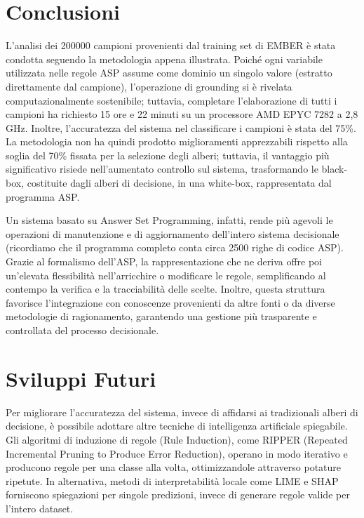 \section{Conclusioni}
L’analisi dei 200000 campioni provenienti dal training set di EMBER è stata condotta seguendo la metodologia appena illustrata. Poiché ogni variabile utilizzata nelle regole ASP assume come dominio un singolo valore (estratto direttamente dal campione), l’operazione di grounding si è rivelata computazionalmente sostenibile; tuttavia, completare l’elaborazione di tutti i campioni ha richiesto 15 ore e 22 minuti su un processore AMD EPYC 7282 a 2,8 GHz. Inoltre, l'accuratezza del sistema nel classificare i campioni è stata del 75\%. La metodologia non ha quindi prodotto miglioramenti apprezzabili rispetto alla soglia del 70\% fissata per la selezione degli alberi; tuttavia, il vantaggio più significativo risiede nell’aumentato controllo sul sistema, trasformando le black-box, costituite dagli alberi di decisione, in una white-box, rappresentata dal programma ASP.

Un sistema basato su Answer Set Programming, infatti, rende più agevoli le operazioni di manutenzione e di aggiornamento dell’intero sistema decisionale (ricordiamo che il programma completo conta circa 2500 righe di codice ASP). Grazie al formalismo dell’ASP, la rappresentazione che ne deriva offre poi un’elevata flessibilità nell’arricchire o modificare le regole, semplificando al contempo la verifica e la tracciabilità delle scelte. Inoltre, questa struttura favorisce l’integrazione con conoscenze provenienti da altre fonti o da diverse metodologie di ragionamento, garantendo una gestione più trasparente e controllata del processo decisionale.

\section{Sviluppi Futuri}
Per migliorare l’accuratezza del sistema, invece di affidarsi ai tradizionali alberi di decisione, è possibile adottare altre tecniche di intelligenza artificiale spiegabile. Gli algoritmi di induzione di regole (Rule Induction), come RIPPER (Repeated Incremental Pruning to Produce Error Reduction), operano in modo iterativo e producono regole per una classe alla volta, ottimizzandole attraverso potature ripetute. In alternativa, metodi di interpretabilità locale come LIME e SHAP forniscono spiegazioni per singole predizioni, invece di generare regole valide per l’intero dataset.

